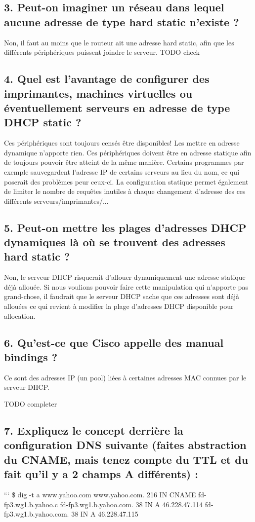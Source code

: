 \documentclass{article}
\begin{document}
\subsection*{3. Peut-on imaginer un réseau dans lequel aucune adresse de type hard static n’existe ?}
Non, il faut au moins que le routeur ait une adresse hard static, afin que les différents périphériques puissent joindre le serveur.
TODO check

\subsection*{4. Quel est l’avantage de configurer des imprimantes, machines virtuelles ou éventuellement serveurs en adresse de type DHCP static ?}
Ces périphériques sont toujours censés être disponibles! Les mettre en adresse dynamique n'apporte rien. Ces périphériques doivent être en adresse statique afin de toujours pouvoir être atteint de la même manière. Certains programmes par exemple sauvegardent l'adresse IP de certains serveurs au lieu du nom, ce qui poserait des problèmes peur ceux-ci. La configuration statique permet également de limiter le nombre de requêtes inutiles à chaque changement d'adresse des ces différents serveurs/imprimantes/...

\subsection*{5. Peut-on mettre les plages d’adresses DHCP dynamiques là où se trouvent des adresses hard static ?}
Non, le serveur DHCP risquerait d'allouer dynamiquement une adresse statique déjà allouée. Si nous voulions pouvoir faire cette manipulation qui n'apporte pas grand-chose, il faudrait que le serveur DHCP sache que ces adresses sont déjà allouées ce qui revient à modifier la plage d'adresses DHCP disponible pour allocation.

\subsection*{6. Qu’est-ce que Cisco appelle des manual bindings ?}
Ce sont des adresses IP (un pool) liées à certaines adresses MAC connues par le serveur DHCP.

TODO completer

\subsection*{7. Expliquez le concept derrière la configuration DNS suivante (faites abstraction du CNAME, mais tenez compte du TTL et du fait qu’il y a 2 champs A différents) :}
```
\$ dig -t a www.yahoo.com
www.yahoo.com.            216   IN    CNAME   fd-fp3.wg1.b.yahoo.c
fd-fp3.wg1.b.yahoo.com.   38    IN    A       46.228.47.114
fd-fp3.wg1.b.yahoo.com.   38    IN    A       46.228.47.115
\end{document}
